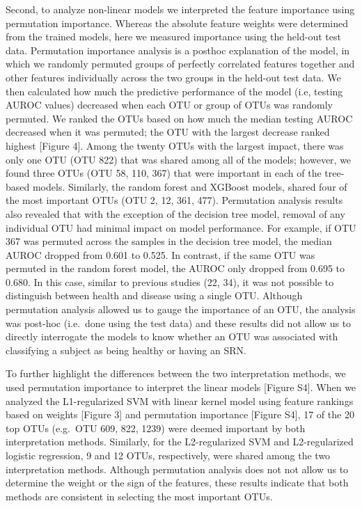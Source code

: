 \documentclass[11pt,]{article}
\begin{document}
Second, to analyze non-linear models we interpreted the feature
importance using permutation importance. Whereas the absolute feature
weights were determined from the trained models, here we measured
importance using the held-out test data. Permutation importance analysis
is a posthoc explanation of the model, in which we randomly permuted
groups of perfectly correlated features together and other features
individually across the two groups in the held-out test data. We then
calculated how much the predictive performance of the model (i.e,
testing AUROC values) decreased when each OTU or group of OTUs was
randomly permuted. We ranked the OTUs based on how much the median
testing AUROC decreased when it was permuted; the OTU with the largest
decrease ranked highest {[}Figure 4{]}. Among the twenty OTUs with the
largest impact, there was only one OTU (OTU 822) that was shared among
all of the models; however, we found three OTUs (OTU 58, 110, 367) that
were important in each of the tree-based models. Similarly, the random
forest and XGBoost models, shared four of the most important OTUs (OTU
2, 12, 361, 477). Permutation analysis results also revealed that with
the exception of the decision tree model, removal of any individual OTU
had minimal impact on model performance. For example, if OTU 367 was
permuted across the samples in the decision tree model, the median AUROC
dropped from 0.601 to 0.525. In contrast, if the same OTU was permuted
in the random forest model, the AUROC only dropped from 0.695 to 0.680.
In this case, similar to previous studies (22, 34), it was not possible
to distinguish between health and disease using a single OTU. Although
permutation analysis allowed us to gauge the importance of an OTU, the
analysis was post-hoc (i.e.~done using the test data) and these results
did not allow us to directly interrogate the models to know whether an
OTU was associated with classifying a subject as being healthy or having
an SRN.

To further highlight the differences between the two interpretation
methods, we used permutation importance to interpret the linear models
{[}Figure S4{]}. When we analyzed the L1-regularized SVM with linear
kernel model using feature rankings based on weights {[}Figure 3{]} and
permutation importance {[}Figure S4{]}, 17 of the 20 top OTUs (e.g.~OTU
609, 822, 1239) were deemed important by both interpretation methods.
Similarly, for the L2-regularized SVM and L2-regularized logistic
regression, 9 and 12 OTUs, respectively, were shared among the two
interpretation methods. Although permutation analysis does not not allow
us to determine the weight or the sign of the features, these results
indicate that both methods are consistent in selecting the most
important OTUs.
\end{document}
